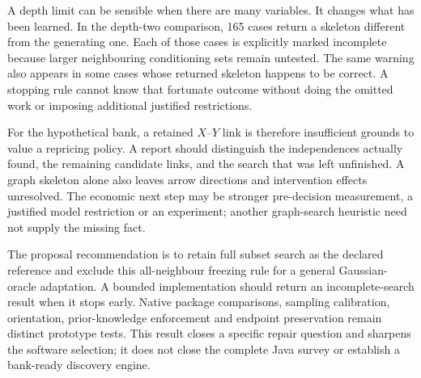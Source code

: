 A depth limit can be sensible when there are many variables. It changes
what has been learned. In the depth-two comparison, 165 cases return a
skeleton different from the generating one. Each of those cases is explicitly
marked incomplete because larger neighbouring conditioning sets remain
untested. The same warning also appears in some cases whose returned
skeleton happens to be correct. A stopping rule cannot know that fortunate
outcome without doing the omitted work or imposing additional justified
restrictions.

For the hypothetical bank, a retained $X$--$Y$ link is therefore insufficient
grounds to value a repricing policy. A report should distinguish the
independences actually found, the remaining candidate links, and the
search that was left unfinished. A graph skeleton alone also leaves arrow
directions and intervention effects unresolved. The economic next step may
be stronger pre-decision measurement, a justified model restriction or an
experiment; another graph-search heuristic need not supply the missing fact.

The proposal recommendation is to retain full subset search as the declared
reference and exclude this all-neighbour freezing rule for a general
Gaussian-oracle adaptation. A bounded implementation should return an
incomplete-search result when it stops early. Native package comparisons,
sampling calibration, orientation, prior-knowledge enforcement and endpoint
preservation remain distinct prototype tests. This result closes a specific
repair question and sharpens the software selection; it does not close the
complete Java survey or establish a bank-ready discovery engine.
